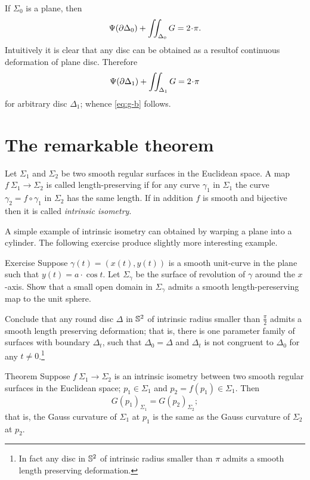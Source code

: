 If $\Sigma_0$ is a plane, then 
\[\tgc{\partial\Delta_0}+\iint_{\Delta_0} G=2\cdot \pi.\]
Intuitively it is clear that any disc can be obtained as a resultof continuous deformation of plane disc.
Therefore 
\[\tgc{\partial\Delta_1}+\iint_{\Delta_1} G=2\cdot \pi\]
for arbitrary disc $\Delta_1$; whence \ref{eq:g-b} follows.
\qeds








\section{The remarkable theorem}

Let $\Sigma_1$ and $\Sigma_2$ be two smooth regular surfaces in the Euclidean space.
A map $f\:\Sigma_1\to \Sigma_2$ is called  length-preserving if for any curve $\gamma_1$ in $\Sigma_1$ the curve $\gamma_2=f\circ\gamma_1$ in $\Sigma_2$ has the same length. %
If in addition $f$ is smooth and bijective then it is called \emph{intrinsic isometry}. 

A simple example of intrinsic isometry can obtained by warping a plane into a cylinder.
The following exercise produce slightly more interesting example.

\begin{thm}{Exercise}
Suppose $\gamma(t)=(x(t),y(t))$ is a smooth unit-curve in the plane such that $y(t)=a\cdot \cos t$.
Let $\Sigma_\gamma$ be the surface of revolution of $\gamma$ around the $x$-axis.
Show that a small open domain in $\Sigma_\gamma$ admits a smooth length-pereserving map to the unit sphere.

Conclude that any round disc $\Delta$ in $\mathbb{S}^2$ of intrinsic radius smaller than $\tfrac\pi2$ admits a smooth length preserving deformation; that is, there is one parameter family of surfaces with boundary $\Delta_t$, such that $\Delta_0=\Delta$ and $\Delta_t$ is not congruent to $\Delta_0$ for any $t\ne0$.\footnote{In fact any disc in $\mathbb{S}^2$ of intrinsic radius smaller than $\pi$ admits a smooth length preserving deformation. %
}
\end{thm}


\begin{thm}{Theorem}\label{thm:remarkable}
Suppose $f\:\Sigma_1\to \Sigma_2$ is an intrinsic isometry between two smooth regular surfaces in  the Euclidean space; $p_1\in \Sigma_1$ and $p_2=f(p_1)\in \Sigma_1$.
Then 
\[G(p_1)_{\Sigma_1}=G(p_2)_{\Sigma_2};\]
that is, the Gauss curvature of $\Sigma_1$ at $p_1$ is the same as the Gauss curvature of $\Sigma_2$ at $p_2$.
\end{thm}

